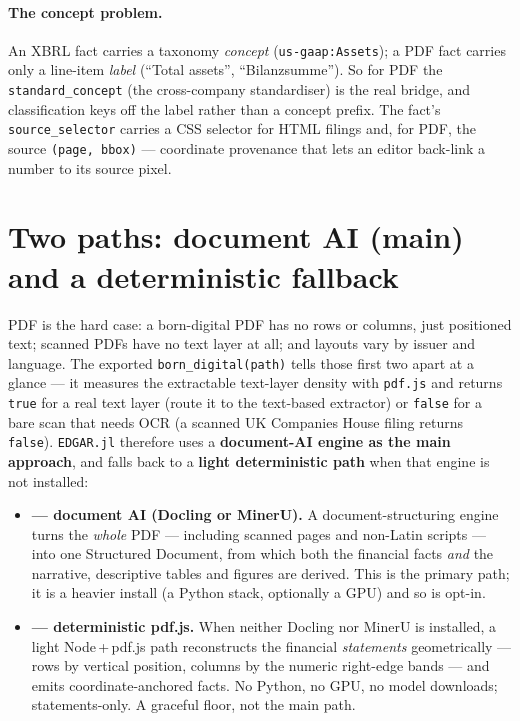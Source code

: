 \documentclass[11pt,a4paper]{report}
\begin{document}
\paragraph{The concept problem.} An XBRL fact carries a taxonomy \emph{concept}
(\texttt{us-gaap:Assets}); a PDF fact carries only a line-item \emph{label} (``Total assets'',
``Bilanzsumme''). So for PDF the \texttt{standard\_concept} (the cross-company standardiser) is the real
bridge, and classification keys off the label rather than a concept prefix. The fact's
\texttt{source\_selector} carries a CSS selector for HTML filings and, for PDF, the source
\texttt{(page, bbox)} --- coordinate provenance that lets an editor back-link a number to its source pixel.

\section{Two paths: document AI (main) and a deterministic fallback}

PDF is the hard case: a born-digital PDF has no rows or columns, just positioned text; scanned PDFs have
no text layer at all; and layouts vary by issuer and language. The exported \texttt{born\_digital(path)}
tells those first two apart at a glance --- it measures the extractable text-layer density with
\texttt{pdf.js} and returns \texttt{true} for a real text layer (route it to the text-based extractor) or
\texttt{false} for a bare scan that needs OCR (a scanned UK Companies House filing returns \texttt{false}).
\texttt{EDGAR.jl} therefore uses a \textbf{document-AI engine as the main approach}, and falls back to a
\textbf{light deterministic path} when that engine is not installed:

\begin{itemize}
  \item[\textbf{Main}] \textbf{--- document AI (Docling or MinerU).} A document-structuring engine turns
    the \emph{whole} PDF --- including scanned pages and non-Latin scripts --- into one Structured
    Document, from which both the financial facts \emph{and} the narrative, descriptive tables and figures
    are derived. This is the primary path; it is a heavier install (a Python stack, optionally a GPU) and
    so is opt-in.
  \item[\textbf{Fallback}] \textbf{--- deterministic pdf.js.} When neither Docling nor MinerU is
    installed, a light Node\,+\,pdf.js path reconstructs the financial \emph{statements} geometrically ---
    rows by vertical position, columns by the numeric right-edge bands --- and emits coordinate-anchored
    facts. No Python, no GPU, no model downloads; statements-only. A graceful floor, not the main path.
\end{itemize}
\end{document}
